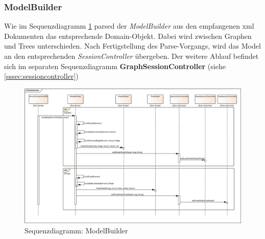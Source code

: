 \documentclass[11pt,a4paper,english,oneside]{book}
\numberwithin{equation}{chapter}
\begin{document}
	\subsubsection{ModelBuilder} 	\label{sssec:modelbuilder}
	Wie im Sequenzdiagramm \ref{fig:sd-modelbuilder} parsed der \textit{ModelBuilder} aus den empfangenen \gls{xml} Dokumenten das entsprechende Domain-Objekt. Dabei wird zwischen Graphen und Trees unterschieden. Nach Fertigstellung des Parse-Vorgangs, wird das Model an den entsprechenden \textit{SessionController} übergeben. Der weitere Ablauf befindet sich im separaten Sequenzdiagramm \textbf{GraphSessionController} (siehe \ref{sssec:sessioncontroller})
	\begin{figure}[h!]
		\centering
		\includegraphics[width=\linewidth]{assets/images/modelbuilder}
		\caption{Sequenzdiagramm: ModelBuilder}
		\label{fig:sd-modelbuilder}
	\end{figure}
\end{document}
